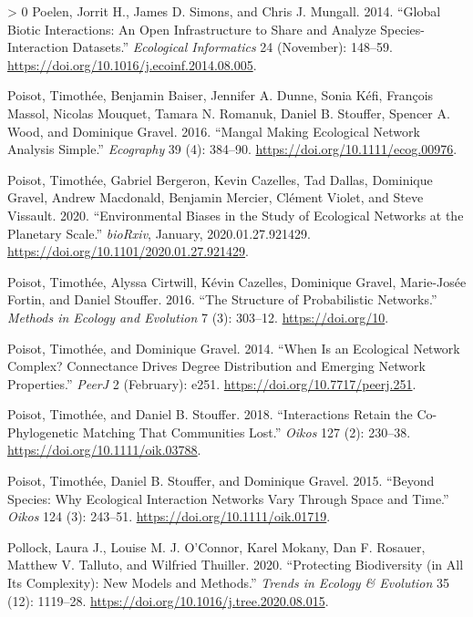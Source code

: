\documentclass[11pt]{article}
\newlength{\cslhangindent}
\newenvironment{CSLReferences}[3] %
 {%
  \setlength{\parindent}{0pt}
  \ifodd #1 \everypar{\setlength{\hangindent}{\cslhangindent}}\ignorespaces\fi
  \ifnum #2 > 0
  \setlength{\parskip}{#2\baselineskip}
  \fi
 }%
 {}
\begin{document}
\begin{CSLReferences}{1}{0}
\leavevmode\hypertarget{ref-Poelen2014GloBio}{}%
Poelen, Jorrit H., James D. Simons, and Chris J. Mungall. 2014.
{``Global Biotic Interactions: An Open Infrastructure to Share and
Analyze Species-Interaction Datasets.''} \emph{Ecological Informatics}
24 (November): 148--59.
\url{https://doi.org/10.1016/j.ecoinf.2014.08.005}.

\leavevmode\hypertarget{ref-Poisot2016ManMak}{}%
Poisot, Timothée, Benjamin Baiser, Jennifer A. Dunne, Sonia Kéfi,
François Massol, Nicolas Mouquet, Tamara N. Romanuk, Daniel B. Stouffer,
Spencer A. Wood, and Dominique Gravel. 2016. {``Mangal Making Ecological
Network Analysis Simple.''} \emph{Ecography} 39 (4): 384--90.
\url{https://doi.org/10.1111/ecog.00976}.

\leavevmode\hypertarget{ref-Poisot2020EnvBia}{}%
Poisot, Timothée, Gabriel Bergeron, Kevin Cazelles, Tad Dallas,
Dominique Gravel, Andrew Macdonald, Benjamin Mercier, Clément Violet,
and Steve Vissault. 2020. {``Environmental Biases in the Study of
Ecological Networks at the Planetary Scale.''} \emph{bioRxiv}, January,
2020.01.27.921429. \url{https://doi.org/10.1101/2020.01.27.921429}.

\leavevmode\hypertarget{ref-Poisot2016StrPro}{}%
Poisot, Timothée, Alyssa Cirtwill, Kévin Cazelles, Dominique Gravel,
Marie-Josée Fortin, and Daniel Stouffer. 2016. {``The Structure of
Probabilistic Networks.''} \emph{Methods in Ecology and Evolution} 7
(3): 303--12. \url{https://doi.org/10}.

\leavevmode\hypertarget{ref-Poisot2014WheEco}{}%
Poisot, Timothée, and Dominique Gravel. 2014. {``When Is an Ecological
Network Complex? Connectance Drives Degree Distribution and Emerging
Network Properties.''} \emph{PeerJ} 2 (February): e251.
\url{https://doi.org/10.7717/peerj.251}.

\leavevmode\hypertarget{ref-Poisot2018IntRet}{}%
Poisot, Timothée, and Daniel B. Stouffer. 2018. {``Interactions Retain
the Co-Phylogenetic Matching That Communities Lost.''} \emph{Oikos} 127
(2): 230--38. \url{https://doi.org/10.1111/oik.03788}.

\leavevmode\hypertarget{ref-Poisot2015SpeWhy}{}%
Poisot, Timothée, Daniel B. Stouffer, and Dominique Gravel. 2015.
{``Beyond Species: Why Ecological Interaction Networks Vary Through
Space and Time.''} \emph{Oikos} 124 (3): 243--51.
\url{https://doi.org/10.1111/oik.01719}.

\leavevmode\hypertarget{ref-Pollock2020ProBio}{}%
Pollock, Laura J., Louise M. J. O'Connor, Karel Mokany, Dan F. Rosauer,
Matthew V. Talluto, and Wilfried Thuiller. 2020. {``Protecting
Biodiversity (in All Its Complexity): New Models and Methods.''}
\emph{Trends in Ecology \& Evolution} 35 (12): 1119--28.
\url{https://doi.org/10.1016/j.tree.2020.08.015}.


\end{CSLReferences}
\end{document}
